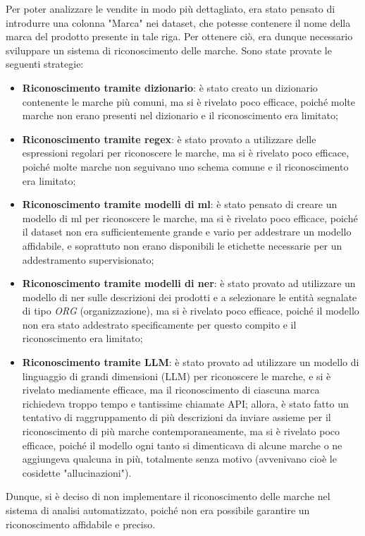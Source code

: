 Per poter analizzare le vendite in modo più dettagliato, era stato pensato di introdurre una colonna "Marca" nei dataset, che potesse contenere il nome della marca del prodotto presente in tale riga. Per ottenere ciò, era dunque necessario sviluppare un sistema di riconoscimento delle marche. Sono state provate le seguenti strategie:
\begin{itemize}
    \item \textbf{Riconoscimento tramite dizionario}: è stato creato un dizionario contenente le marche più comuni, ma si è rivelato poco efficace, poiché molte marche non erano presenti nel dizionario e il riconoscimento era limitato;
    \item \textbf{Riconoscimento tramite regex}: è stato provato a utilizzare delle espressioni regolari per riconoscere le marche, ma si è rivelato poco efficace, poiché molte marche non seguivano uno schema comune e il riconoscimento era limitato;
    \item \textbf{Riconoscimento tramite modelli di \gls{ml}{}}: è stato pensato di creare un modello di \gls{ml} per riconoscere le marche, ma si è rivelato poco efficace, poiché il dataset non era sufficientemente grande e vario per addestrare un modello affidabile, e soprattuto non erano disponibili le etichette necessarie per un addestramento supervisionato;
    \item \textbf{Riconoscimento tramite modelli di \gls{ner}{}}: è stato provato ad utilizzare un modello di \gls{ner} sulle descrizioni dei prodotti e a selezionare le entità segnalate di tipo \emph{ORG} (organizzazione), ma si è rivelato poco efficace, poiché il modello non era stato addestrato specificamente per questo compito e il riconoscimento era limitato;
    \item \textbf{Riconoscimento tramite LLM}: è stato provato ad utilizzare un modello di linguaggio di grandi dimensioni (LLM) per riconoscere le marche, e si è rivelato mediamente efficace, ma il riconoscimento di ciascuna marca richiedeva troppo tempo e tantissime chiamate API; allora, è stato fatto un tentativo di raggruppamento di più descrizioni da inviare assieme per il riconoscimento di più marche contemporaneamente, ma si è rivelato poco efficace, poiché il modello ogni tanto si dimenticava di alcune marche o ne aggiungeva qualcuna in più, totalmente senza motivo (avvenivano cioè le cosidette "allucinazioni").
\end{itemize}

Dunque, si è deciso di non implementare il riconoscimento delle marche nel sistema di analisi automatizzato, poiché non era possibile garantire un riconoscimento affidabile e preciso.


